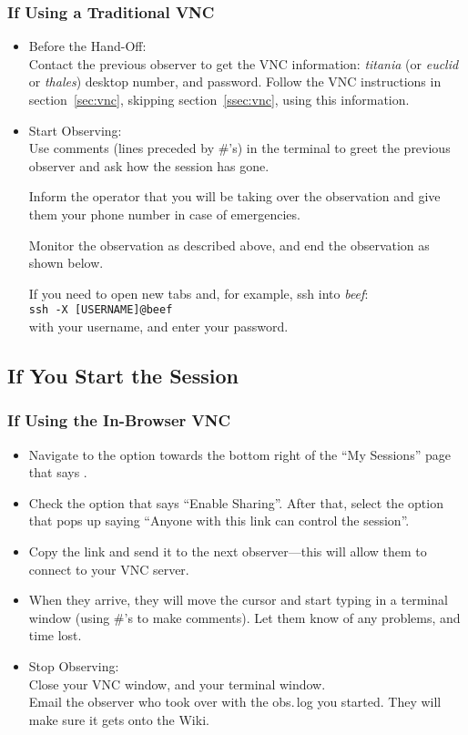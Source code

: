 \documentclass[11pt, reqno, tbtags]{article}
\begin{document}
 \subsubsection{If Using a Traditional VNC} \begin{itemize}
 \item Before the Hand-Off: \\
 Contact the previous observer to get the VNC information: \textit{titania} (or \textit{euclid} or \textit{thales}) desktop number, and password.  Follow the VNC instructions in section~\ref{sec:vnc}, skipping section~\ref{ssec:vnc}, using this information.                             

 \item Start Observing: \\
 Use comments (lines preceded by \#'s) in the terminal to greet the previous observer and ask how the session has gone.  

 Inform the operator that you will be taking over the observation and give them your phone number in case of emergencies.  

 Monitor the observation as described above, and end the observation as shown below.  

 If you need to open new tabs and, for example, ssh into \textit{beef}: \\
 \texttt{ssh -X [USERNAME]@beef} \\
 with your username, and enter your password. 
\end{itemize} 

\subsection{If You Start the Session} %

 \subsubsection{If Using the In-Browser VNC} \begin{itemize} \label{sssec:hndoff}
  \item Navigate to the option towards the bottom right of the ``My Sessions'' page that says . 
  \item Check the option that says ``Enable Sharing''. After that, select the option that pops up saying ``Anyone with this link can control the session''. 
  \item Copy the link and send it to the next observer---this will allow them to connect to your VNC server.
  \item When they arrive, they will move the cursor and start typing in a terminal window (using \#'s to make comments).  Let them know of any problems, and time lost.  
  \item Stop Observing: \\
 Close your VNC window, and your terminal window.  \\
 Email the observer who took over with the obs.\,log you started.  They will make sure it gets onto the Wiki.  
  \end{itemize}
\end{document}
